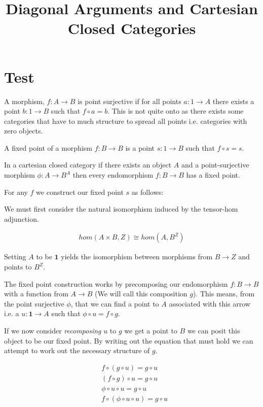 \documentclass[a4paper,10pt]{article}
\date{}
\title{Diagonal Arguments and Cartesian Closed Categories\vspace{-20mm}}
\begin{document}
\maketitle
\section{Test}

A morphism, $f: A \rightarrow B$ is point surjective if for all points
$a: 1 \rightarrow A$ there exists a point $b: 1 \rightarrow B$ such that
$f \circ a = b$. This is not quite onto as there exists some categories that
have to much structure to spread all points i.e. categories with zero objects.

A fixed point of a morphism $f: B \rightarrow B$ is a point $s : 1 \rightarrow
B$ such that $f \circ s = s$.

In a cartesian closed category if there exists an object
$A$ and a point-surjective morphism $\phi: A \rightarrow B^{A}$ then every
endomorphism $f: B \rightarrow B$ has a fixed point.

For any $f$ we construct our fixed point $s$ as follows:

We must first consider the natural isomorphism induced by the tensor-hom
adjunction.

\begin{align*}
    hom(A\times B, Z) \cong hom(A, B^Z)
\end{align*}

Setting $A$ to be $\textbf{1}$ yields the isomorphism between morphisms from
$B \rightarrow Z$ and points to $B^{Z}$.

The fixed point construction works by precomposing our endomorphism $f: B
\rightarrow B$ with a function from $A \rightarrow B$ (We will call this
composition $g$). This means, from the point surjective $\phi$, that we can find
a point to $A$ associated with this arrow i.e. a $u: \textbf{1} \rightarrow A$
such that $\phi \circ u = f \circ g$.

If we now consider \textit{recomposing} $u$ to $g$ we get a point to $B$ we can
posit this object to be our fixed point. By writing out the equation that must
hold we can attempt to work out the necessary structure of $g$.

\begin{align*}
    &f \circ (g \circ u) = g \circ u \\
    &(f \circ g) \circ u = g \circ u \\
    &\phi \circ u \circ u = g \circ u \\
    &f \circ (\phi \circ u \circ u) = g \circ u
\end{align*}
\end{document}
